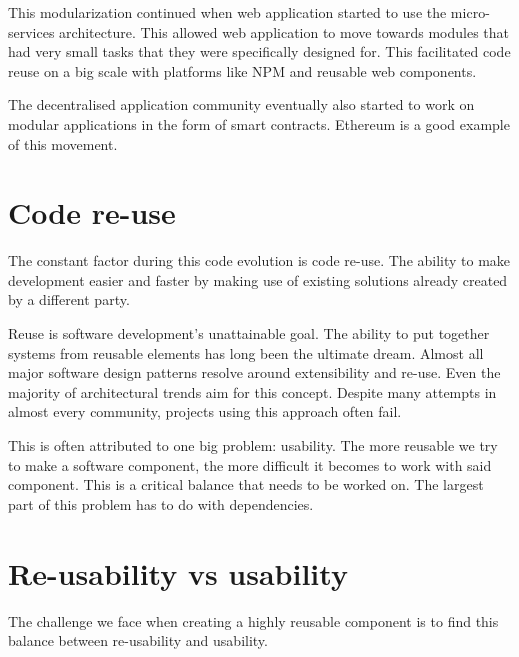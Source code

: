This modularization continued when web application started to use the micro-services architecture. This allowed web application to move towards modules that had very small tasks that they were specifically designed for. This facilitated code reuse on a big scale with platforms like NPM and reusable web components.

The decentralised application community eventually also started to work on modular applications in the form of smart contracts. Ethereum is a good example of this movement.

\section{Code re-use}

The constant factor during this code evolution is code re-use. The ability to make development easier and faster by making use of existing solutions already created by a different party.

Reuse is software development’s unattainable goal. The ability to put together systems from reusable elements has long been the ultimate dream. Almost all major software design patterns resolve around extensibility and re-use. Even the majority of architectural trends aim for this concept. Despite many attempts in almost every community, projects using this approach often fail.



This is often attributed to one big problem: usability. The more reusable we try to make a software component, the more difficult it becomes to work with said component. This is a critical balance that needs to be worked on. The largest part of this problem has to do with dependencies.


\section{Re-usability vs usability}
The challenge we face when creating a highly reusable component is to find this balance between re-usability and usability.

